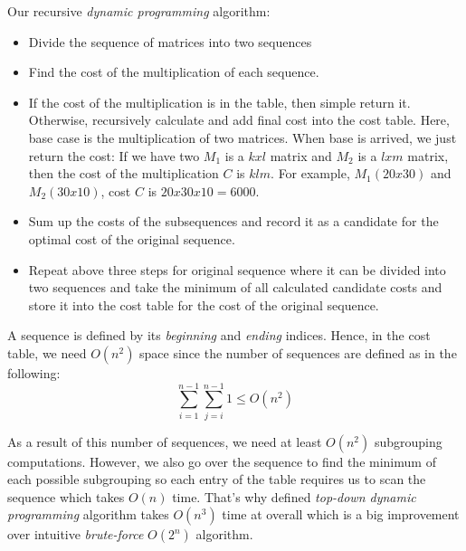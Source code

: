 Our recursive \textit{dynamic programming} algorithm:
\begin{itemize}
  \item Divide the sequence of matrices into two sequences
  \item Find the cost of the multiplication of each sequence.  
  \item If the cost of the multiplication is in the table, then simple return it. Otherwise, recursively calculate and add final cost into the cost table. Here, base case is  the multiplication of two matrices. When base is arrived, we just return the cost: If we have two $M_1$ is a $k x l$ matrix and $M_2$ is a  $l x m$ matrix, then the cost of the multiplication $C$ is $klm$. For example, $M_1(20 x 30)$ and $M_2(30 x 10)$, cost $C$ is $20 x 30 x 10 = 6000$.
  \item Sum up the costs of the subsequences and record it as a candidate for the optimal cost of the original sequence.
  \item Repeat above three steps for original sequence where it can be divided into two sequences and take the minimum of all calculated candidate costs and store it into the cost table for the cost of the original sequence.
\end{itemize}

A sequence is defined by its \textit{beginning} and \textit{ending} indices. Hence, in the cost table, we need $O(n^2)$ space since the number of sequences are defined as in the following:
$$
  \sum_{i=1}^{n-1}{\sum_{j=i}^{n-1} 1} \leq O(n^2)
$$

As a result of this number of sequences, we need at least $O(n^2)$ subgrouping computations. However, we also go over the sequence to find the minimum of each possible subgrouping so each entry of the table requires us to scan the sequence which takes $O(n)$ time. That's why defined \textit{top-down dynamic programming} algorithm takes $O(n^3)$ time at overall which is a big improvement over intuitive \textit{brute-force} $O(2^n)$ algorithm.